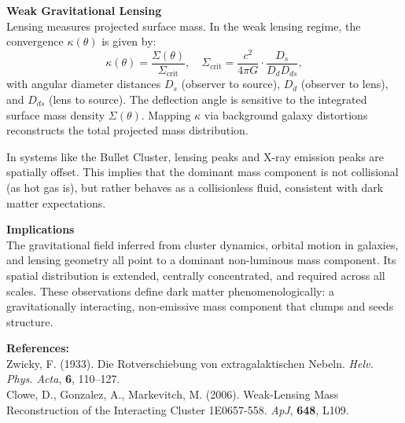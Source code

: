 \begin{technical}
\noindent\textbf{Weak Gravitational Lensing}\\[0.25em]
Lensing measures projected surface mass. In the weak lensing regime, the convergence \( \kappa(\theta) \) is given by:
\[
\kappa(\theta) = \frac{\Sigma(\theta)}{\Sigma_{\text{crit}}}, \quad
\Sigma_{\text{crit}} = \frac{c^2}{4\pi G} \cdot \frac{D_s}{D_d D_{ds}},
\]
with angular diameter distances \( D_s \) (observer to source), \( D_d \) (observer to lens), and \( D_{ds} \) (lens to source). The deflection angle is sensitive to the integrated surface mass density \( \Sigma(\theta) \). Mapping \( \kappa \) via background galaxy distortions reconstructs the total projected mass distribution.

In systems like the Bullet Cluster, lensing peaks and X-ray emission peaks are spatially offset. This implies that the dominant mass component is not collisional (as hot gas is), but rather behaves as a collisionless fluid, consistent with dark matter expectations.

\noindent\textbf{Implications}\\[0.25em]
The gravitational field inferred from cluster dynamics, orbital motion in galaxies, and lensing geometry all point to a dominant non-luminous mass component. Its spatial distribution is extended, centrally concentrated, and required across all scales. These observations define dark matter phenomenologically: a gravitationally interacting, non-emissive mass component that clumps and seeds structure.

\vspace{0.5em}
\noindent\textbf{References:}\\[0.25em]
Zwicky, F. (1933). Die Rotverschiebung von extragalaktischen Nebeln. \textit{Helv. Phys. Acta}, \textbf{6}, 110--127.\\
Clowe, D., Gonzalez, A., Markevitch, M. (2006). Weak-Lensing Mass Reconstruction of the Interacting Cluster 1E0657-558. \textit{ApJ}, \textbf{648}, L109.
\end{technical}
